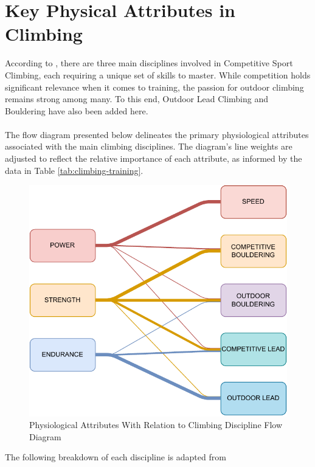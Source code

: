 \section{Key Physical Attributes in Climbing}
According to \citep{brozek_climbing_2023}, there are three main disciplines involved in Competitive Sport Climbing, each requiring a unique set of skills to master. While competition holds significant relevance when it comes to training, the passion for outdoor climbing remains strong among many. To this end, Outdoor Lead Climbing and Bouldering have also been added here.\\\\
The flow diagram presented below delineates the primary physiological attributes associated with the main climbing disciplines. The diagram's line weights are adjusted to reflect the relative importance of each attribute, as informed by the data in Table \ref{tab:climbing-training}.

\begin{figure}[H]
    \centering
    \includegraphics[width=0.9\linewidth]{figs/disciplines_physical.pdf}
    \caption{Physiological Attributes With Relation to Climbing Discipline Flow Diagram}
    \label{attribs-disc-flow}
\end{figure}
\noindent
The following breakdown of each discipline is adapted from \citep{bechtel_endurance_2024}

